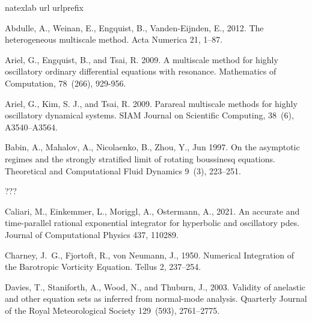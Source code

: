 \documentclass[a4,12pt]{article}
\renewenvironment{thebibliography}[1]{%
    \begin{oldthebibliography}{#1}%
    \setlength{\parskip}{0ex}%
    \setlength{\itemsep}{0ex}%
}%
                 {%
  \end{oldthebibliography}%
                 }
\newcommand{\todo}[1]{\vspace{5 mm}\par \noindent
\framebox{\begin{minipage}[c]{0.95 \textwidth}
\tt #1 \end{minipage}}\vspace{5 mm}\par}
\begin{document}
\todo{UPDATE bibiography}

% 
\begin{thebibliography}{17}
\expandafter\ifx\csname natexlab\endcsname\relax\def\natexlab#1{#1}\fi
\expandafter\ifx\csname url\endcsname\relax
  \def\url#1{\texttt{#1}}\fi
\expandafter\ifx\csname urlprefix\endcsname\relax\def\urlprefix{URL }\fi

Abdulle, A., Weinan, E., Engquist, B., Vanden-Eijnden, E., 2012. The
  heterogeneous multiscale method. Acta Numerica 21, 1--87.

  Ariel, G., Engquist, B., and Tsai, R. 2009. A multiscale method for highly oscillatory ordinary differential equations with resonance. Mathematics of Computation, 78~(266), 929-956.

  Ariel, G., Kim, S. J., and Tsai, R. 2009. Parareal multiscale methods for highly oscillatory dynamical systems. SIAM Journal on Scientific Computing,
  38~(6), A3540--A3564.

Babin, A., Mahalov, A., Nicolaenko, B., Zhou, Y., Jun 1997. On the asymptotic
  regimes and the strongly stratified limit of rotating boussinesq equations.
  Theoretical and Computational Fluid Dynamics 9~(3), 223--251.

???


Caliari, M., Einkemmer, L., Moriggl, A., Ostermann, A., 2021. An accurate and
  time-parallel rational exponential integrator for hyperbolic and oscillatory
  pdes. Journal of Computational Physics 437, 110289.

Charney, J.~G., Fjortoft, R., von Neumann, J., 1950. Numerical {I}ntegration of
  the {B}arotropic {V}orticity {E}quation. Tellus 2, 237--254.

Davies, T., Staniforth, A., Wood, N., and Thuburn, J., 2003. Validity of anelastic
  and other equation sets as inferred from normal-mode analysis. Quarterly
  Journal of the Royal Meteorological Society 129~(593), 2761--2775.


\end{thebibliography}
\end{document}
